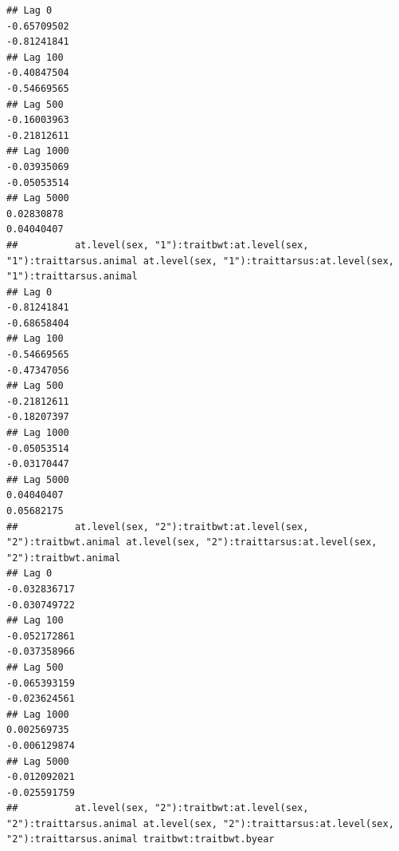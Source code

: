 \documentclass[
  12pt,
]{book}
\begin{document}
\begin{verbatim}
## Lag 0                                                       -0.65709502                                                       -0.81241841
## Lag 100                                                     -0.40847504                                                       -0.54669565
## Lag 500                                                     -0.16003963                                                       -0.21812611
## Lag 1000                                                    -0.03935069                                                       -0.05053514
## Lag 5000                                                     0.02830878                                                        0.04040407
##          at.level(sex, "1"):traitbwt:at.level(sex, "1"):traittarsus.animal at.level(sex, "1"):traittarsus:at.level(sex, "1"):traittarsus.animal
## Lag 0                                                          -0.81241841                                                          -0.68658404
## Lag 100                                                        -0.54669565                                                          -0.47347056
## Lag 500                                                        -0.21812611                                                          -0.18207397
## Lag 1000                                                       -0.05053514                                                          -0.03170447
## Lag 5000                                                        0.04040407                                                           0.05682175
##          at.level(sex, "2"):traitbwt:at.level(sex, "2"):traitbwt.animal at.level(sex, "2"):traittarsus:at.level(sex, "2"):traitbwt.animal
## Lag 0                                                      -0.032836717                                                      -0.030749722
## Lag 100                                                    -0.052172861                                                      -0.037358966
## Lag 500                                                    -0.065393159                                                      -0.023624561
## Lag 1000                                                    0.002569735                                                      -0.006129874
## Lag 5000                                                   -0.012092021                                                      -0.025591759
##          at.level(sex, "2"):traitbwt:at.level(sex, "2"):traittarsus.animal at.level(sex, "2"):traittarsus:at.level(sex, "2"):traittarsus.animal traitbwt:traitbwt.byear

\end{verbatim}
\end{document}
